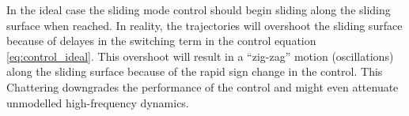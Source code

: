 In the ideal case the sliding mode control should begin sliding along the sliding surface when reached. In reality, the trajectories will overshoot the sliding surface because of delayes in the switching term in the control equation \ref{eq:control_ideal}. This overshoot will result in a ``zig-zag'' motion (oscillations) along the sliding surface because of the rapid sign change in the control. This Chattering downgrades the performance of the control and might even attenuate unmodelled high-frequency dynamics.

